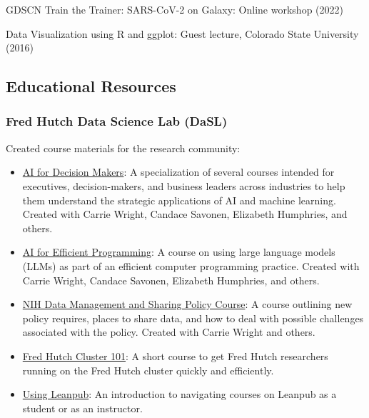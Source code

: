 \documentclass{cv}
\begin{document}
GDSCN Train the Trainer: SARS-CoV-2 on Galaxy: Online workshop (2022)

Data Visualization using R and ggplot: Guest lecture, Colorado State University (2016)

\subsection*{Educational Resources}

\subsubsection*{Fred Hutch Data Science Lab (DaSL)}

Created course materials for the research community: 

\begin{itemize}

\item \href{https://hutchdatascience.org/AI_for_Decision_Makers/}{AI for Decision Makers}: A specialization of several courses intended for executives, decision-makers, and business leaders across industries to help them understand the strategic applications of AI and machine learning. Created with Carrie Wright, Candace Savonen, Elizabeth Humphries, and others.

\item \href{https://hutchdatascience.org/AI_for_Efficient_Programming/}{AI for Efficient Programming}: A course on using large language models (LLMs) as part of an efficient computer programming practice. Created with Carrie Wright, Candace Savonen, Elizabeth Humphries, and others.

\item \href{https://hutchdatascience.org/NIH_Data_Sharing/}{NIH Data Management and Sharing Policy Course}: A course outlining new policy requires, places to share data, and how to deal with possible challenges associated with the policy. Created with Carrie Wright and others.

\item \href{https://hutchdatascience.org/FH_Cluster_Guide/}{Fred Hutch Cluster 101}: A short course to get Fred Hutch researchers running on the Fred Hutch cluster quickly and efficiently.

\item \href{https://hutchdatascience.org/Using_Leanpub/}{Using Leanpub}: An introduction to navigating courses on Leanpub as a student or as an instructor.

\end{itemize}
\end{document}
